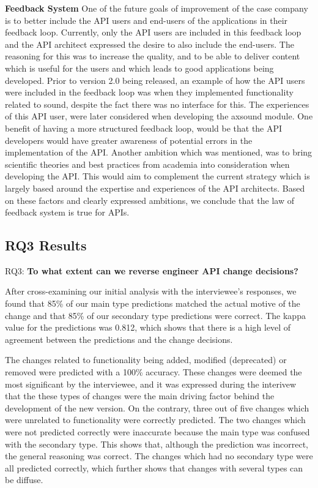 \documentclass{sig-alternate}
\begin{document}
\smallskip \noindent
\textbf{Feedback System  } 
One of the future goals of improvement of the case company is to better include the API users and end-users of the applications in their feedback loop. Currently, only the API users are included in this feedback loop and the API architect expressed the desire to also include the end-users. The reasoning for this was to increase the quality, and to be able to deliver content which is useful for the users and which leads to good applications being developed. Prior to version 2.0 being released, an example of how the API users were included in the feedback loop was when they implemented functionality related to sound, despite the fact there was no interface for this.  The experiences of this API user, were later considered when developing the axsound module. One benefit of having a more structured feedback loop, would be that the API developers would have greater awareness of potential errors in the implementation of the API. Another ambition which was mentioned, was to bring scientific theories and best practices from academia into consideration when developing the API. This would aim to complement the current strategy which is largely based around the expertise and experiences of the API architects. Based on these factors and clearly expressed ambitions, we conclude that the law of feedback system is true for APIs. 



\subsection{RQ3 Results}
\noindent
RQ3: \textbf{To what extent can we reverse engineer API change decisions?}
\smallskip

After cross-examining our initial analysis with the interviewee's responses, we found that 85\% of our main type predictions matched the actual motive of the change and that 85\% of our secondary type predictions were correct. The kappa value \cite{cohen1968weighted} for the predictions was 0.812, which shows that there is a high level of agreement between the predictions and the change decisions. 

The changes related to functionality being added, modified (deprecated) or removed were predicted with a 100\% accuracy. These changes were deemed the most significant by the interviewee, and it was expressed during the interivew that the these types of changes were the main driving factor behind the development of the new version. On the contrary, three out of five changes which were unrelated to functionality were correctly predicted. The two changes which were not predicted correctly were inaccurate because the main type was confused with the secondary type. This shows that, although the prediction was incorrect, the general reasoning was correct. The changes which had no secondary type were all predicted correctly, which further shows that changes with several types can be diffuse. 
\end{document}
